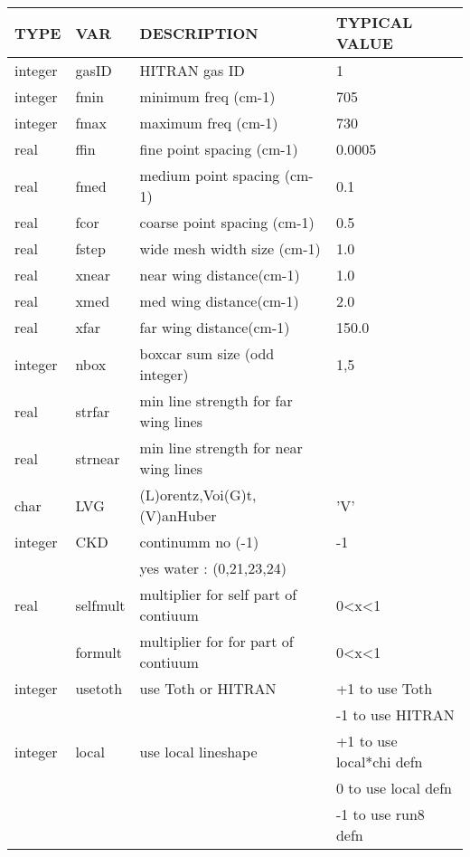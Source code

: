 \documentclass[11pt]{article}
\begin{document}
\begin{longtable}{llll}
\hline
\hline
  TYPE  &   VAR  &         DESCRIPTION  &            TYPICAL VALUE\\
\hline
\hline
integer & gasID  &       HITRAN gas ID      &            1\\
\hline

integer & fmin    &      minimum freq (cm-1) &          705\\
integer & fmax    &      maximum freq (cm-1) &          730\\
\hline

real   &  ffin    &      fine point spacing (cm-1) &    0.0005\\
real   &  fmed    &      medium point spacing (cm-1)&   0.1\\
real   &  fcor    &      coarse point spacing (cm-1)  & 0.5\\
\hline

real   &  fstep   &      wide mesh width size (cm-1) &    1.0\\
real   &  xnear   &      near wing distance(cm-1)    &    1.0\\
real   &  xmed    &      med wing distance(cm-1)     &    2.0\\
real   &  xfar    &      far wing distance(cm-1)     &    150.0\\
\hline

integer & nbox     &     boxcar sum size (odd integer) &  1,5\\
\hline

real   &  strfar   &    min line strength for far wing lines & \\
real   &  strnear  &    min line strength for near wing lines& \\
\hline

char   &  LVG      &      (L)orentz,Voi(G)t,(V)anHuber  &  'V' \\
integer &  CKD     &       continumm no (-1)            &   -1 \\
        &          &       yes water : (0,21,23,24)    & \\
\hline

real    &  selfmult &       multiplier for self part of contiuum &  0<x<1 \\
        &  formult  &       multiplier for for  part of contiuum  & 0<x<1 \\
\hline

integer & usetoth &        use Toth or HITRAN &           +1 to use Toth \\
        &         &                           &          -1 to use HITRAN \\
\hline

integer & local &         use local lineshape   & +1 to use local*chi defn\\
        &       &                                  &  0 to use local defn \\
        &       &                                  & -1 to use run8 defn\\
\hline
\hline
\end{longtable}
\end{document}
